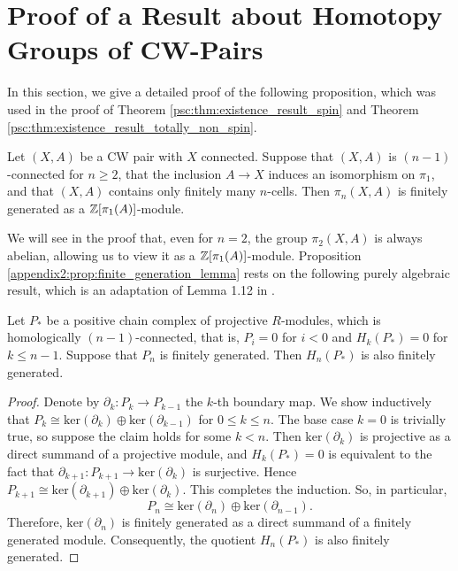 \chapter{Proof of a Result about Homotopy Groups of CW-Pairs}
\label{chapter:appendix_b}

In this section, we give a detailed proof of the following proposition, which was used in the proof of Theorem \ref{psc:thm:existence_result_spin} and Theorem \ref{psc:thm:existence_result_totally_non_spin}.

\begin{proposition}
    \label{appendix2:prop:finite_generation_lemma}
    Let $(X,A)$ be a CW pair with $X$ connected. Suppose that $(X,A)$ is $(n-1)$-connected for $n \geq 2$, that the inclusion $A \to X$ induces an isomorphism on $\pi_1$, and that $(X,A)$ contains only finitely many $n$-cells. Then $\pi_n(X,A)$ is finitely generated as a $\mathbb{Z}[\pi_1(A)]$-module.
\end{proposition}

We will see in the proof that, even for $n=2$, the group $\pi_2(X,A)$ is always abelian, allowing us to view it as a $\mathbb{Z}[\pi_1(A)]$-module. Proposition \ref{appendix2:prop:finite_generation_lemma} rests on the following purely algebraic result, which is an adaptation of Lemma 1.12 in \cite{Pedersen2017}.

\begin{lemma}
    \label{appendix2:lem:homological_algebra_lemma}
    Let $P_\ast$ be a positive chain complex of projective $R$-modules, which is homologically $(n-1)$-connected, that is, $P_i = 0$ for $i < 0$ and $H_k(P_\ast) = 0$ for $k \leq n-1$. Suppose that $P_n$ is finitely generated. Then $H_n(P_\ast)$ is also finitely generated.
\end{lemma}

\begin{proof}
    Denote by $\partial_k \colon P_k \to P_{k-1}$ the $k$-th boundary map. We show inductively that $P_k \cong \mathrm{ker}(\partial_k) \oplus \mathrm{ker}(\partial_{k-1})$ for $0 \leq k \leq n$. The base case $k = 0$ is trivially true, so suppose the claim holds for some $k < n$. Then $\mathrm{ker}(\partial_k)$ is projective as a direct summand of a projective module, and $H_{k}(P_\ast) = 0$ is equivalent to the fact that $\partial_{k+1} \colon P_{k+1} \to \mathrm{ker}(\partial_k)$ is surjective. Hence $P_{k+1} \cong \mathrm{ker}(\partial_{k+1}) \oplus \mathrm{ker}(\partial_k)$. This completes the induction. So, in particular,
    \[
    P_n \cong \mathrm{ker}(\partial_n) \oplus \mathrm{ker}(\partial_{n-1}).
    \]
    Therefore, $\mathrm{ker}(\partial_n)$ is finitely generated as a direct summand of a finitely generated module. Consequently, the quotient $H_n(P_\ast)$ is also finitely generated. 
\end{proof}

